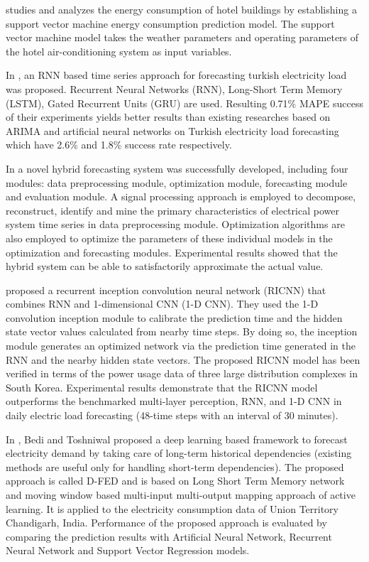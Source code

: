 \cite{SHAO2020102128} studies and analyzes the energy consumption of hotel buildings by establishing a support vector machine energy consumption prediction model.
The support vector machine model takes the weather parameters and operating parameters of the hotel air-conditioning system as input variables.

In \cite{8404313}, an RNN based time series approach for forecasting turkish electricity load was proposed.
Recurrent Neural Networks (RNN), Long-Short Term Memory (LSTM), Gated Recurrent Units (GRU) are used.
Resulting 0.71\% MAPE success of their experiments yields better results than existing researches based on ARIMA and artificial neural networks on Turkish electricity load forecasting which have 2.6\% and 1.8\% success rate respectively.

In \cite{DU2018533} a novel hybrid forecasting system was successfully developed, including four modules: data preprocessing module, optimization module, forecasting module and evaluation module.
A signal processing approach is employed to decompose, reconstruct, identify and mine the primary characteristics of electrical power system time series in data preprocessing module.
Optimization algorithms are also employed to optimize the parameters of these individual models in the optimization and forecasting modules.
Experimental results showed that the hybrid system can be able to satisfactorily approximate the actual value.

\cite{KIM2019328} proposed a recurrent inception convolution neural network (RICNN) that combines RNN and 1-dimensional CNN (1-D CNN).
They used the 1-D convolution inception module to calibrate the prediction time and the hidden state vector values calculated from nearby time steps.
By doing so, the inception module generates an optimized network via the prediction time generated in the RNN and the nearby hidden state vectors.
The proposed RICNN model has been verified in terms of the power usage data of three large distribution complexes in South Korea.
Experimental results demonstrate that the RICNN model outperforms the benchmarked multi-layer perception, RNN, and 1-D CNN in daily electric load forecasting (48-time steps with an interval of 30 minutes).

In \cite{BEDI20191312}, Bedi and Toshniwal proposed a deep learning based framework to forecast electricity demand by taking care of long-term historical dependencies (existing methods are useful only for handling short-term dependencies).
The proposed approach is called D-FED and is based on Long Short Term Memory network and moving window based multi-input multi-output mapping approach of active learning.
It is applied to the electricity consumption data of Union Territory Chandigarh, India.
Performance of the proposed approach is evaluated by comparing the prediction results with Artificial Neural Network, Recurrent Neural Network and Support Vector Regression models.

